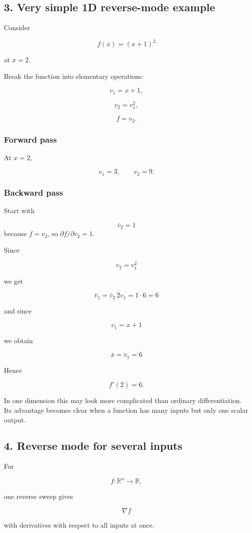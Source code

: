 \documentclass{course_sheet}
\begin{document}
\subsection*{3. Very simple 1D reverse-mode example}
Consider

\[
f(x)=(x+1)^2
\]

at $x=2$.

Break the function into elementary operations:

\[
v_1=x+1,
\]

\[
v_2=v_1^2,
\]

\[
f=v_2.
\]

\subsubsection*{Forward pass}
At $x=2$,

\[
v_1=3,
\qquad
v_2=9.
\]

\subsubsection*{Backward pass}
Start with

\[
\bar v_2=1
\]
because $f=v_2$, so $\partial f/\partial v_2=1$.

Since

\[
v_2=v_1^2
\]

we get

\[
\bar v_1
=
\bar v_2\,2v_1
=1\cdot 6
=6
\]

and since

\[
v_1=x+1
\]

we obtain

\[
\bar x=\bar v_1=6
\]

Hence

\[
f'(2)=6.
\]

In one dimension this may look more complicated than ordinary differentiation. Its advantage becomes clear when a function has many inputs but only one scalar output.

\subsection*{4. Reverse mode for several inputs}
For

\[
f:\mathbb R^n\to\mathbb R,
\]

one reverse sweep gives

\[
\nabla f
\]

with derivatives with respect to all inputs at once.
\end{document}
